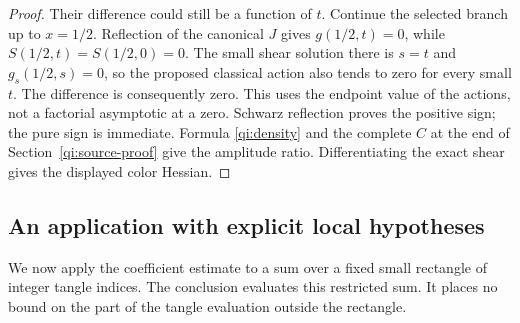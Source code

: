 \begin{proof}
Their difference could still be a function of $t$. Continue the
selected branch up to $x=1/2$. Reflection of the canonical $J$
gives $g(1/2,t)=0$, while $S(1/2,t)=S(1/2,0)=0$. The small
shear solution there is $s=t$ and $g_s(1/2,s)=0$, so the proposed
classical action also tends to zero for every small $t$. The
difference is consequently zero. This uses the endpoint value of
the actions, not a factorial asymptotic at a zero. Schwarz reflection
proves the positive sign; the pure sign is immediate.
Formula \eqref{qi:density} and the complete $C$ at the end of Section~\ref{qi:source-proof} give the amplitude ratio. Differentiating the exact shear gives the displayed color Hessian.
\end{proof}

\subsection{An application with explicit local hypotheses}

We now apply the coefficient estimate to a sum over a fixed small
rectangle of integer tangle indices. The conclusion evaluates this
restricted sum. It places no bound on the part of the tangle
evaluation outside the rectangle.

